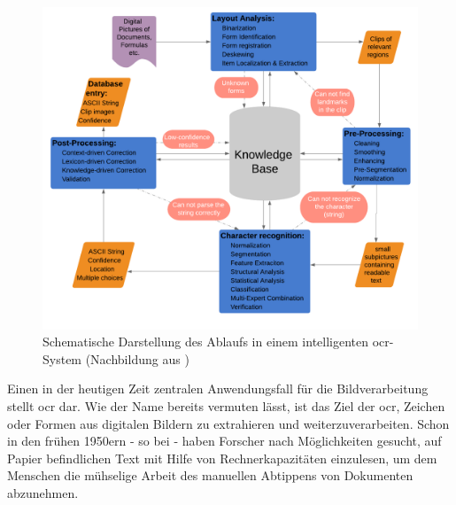 		\begin{figure}[H]
			\centering
			\includegraphics[width=\linewidth]{Ablauf-OCR_Cheriet-et-al.pdf}
			\caption[typisches \gls{ocr}-Ablaufschema]{Schematische Darstellung des 
				Ablaufs in einem intelligenten \gls{ocr}-System (Nachbildung aus 
				\cite[Seite 7]{cher-et-al-ocr})}
			\label{fig:ocr-system}
		\end{figure}
	
		Einen in der heutigen Zeit zentralen Anwendungsfall für die Bildverarbeitung stellt \gls{ocr} dar. Wie der Name bereits vermuten lässt, ist das Ziel der \gls{ocr}, Zeichen oder Formen aus digitalen Bildern zu extrahieren und weiterzuverarbeiten. Schon in den frühen 1950ern - so bei \cite{cher-et-al-ocr} - haben Forscher nach Möglichkeiten gesucht, auf Papier befindlichen Text mit Hilfe von Rechnerkapazitäten einzulesen, um dem Menschen die mühselige Arbeit des manuellen Abtippens von Dokumenten abzunehmen.


